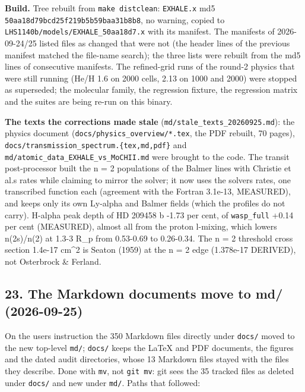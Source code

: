 \documentclass[english,a4paper]{my_memo}
\begin{document}
\textbf{Build.} Tree rebuilt from \texttt{make\ distclean}: \texttt{EXHALE.x} md5
\texttt{50aa18d79bcd25f219b5b59baa31b8b8}, no warning, copied to
\texttt{LHS1140b/models/EXHALE\_50aa18d7.x} with its manifest. The manifests of
2026-09-24/25 listed files as changed that were not (the header lines of the
previous manifest matched the file-name search); the three lists were rebuilt
from the md5 lines of consecutive manifests. The refined-grid runs of the
round-2 physics that were still running (He/H 1.6 on 2000 cells, 2.13 on 1000
and 2000) were stopped as superseded; the molecular family, the regression
fixture, the regression matrix and the suites are being re-run on this binary.

\textbf{The texts the corrections made stale} (\texttt{md/stale\_texts\_20260925.md}):
the physics document (\texttt{docs/physics\_overview/*.tex}, the PDF rebuilt, 70
pages), \texttt{docs/transmission\_spectrum.\{tex,md,pdf\}} and
\texttt{md/atomic\_data\_EXHALE\_vs\_MoCHII.md} were brought to the code. The transit
post-processor built the n = 2 populations of the Balmer lines with Christie
et al.\textquotesingle s rates while claiming to mirror the solver; it now uses the solver\textquotesingle s
rates, one transcribed function each (agreement with the Fortran 3.1e-13,
MEASURED), and keeps only its own Ly-alpha and Balmer fields (which the
profiles do not carry). H-alpha peak depth of HD 209458 b -1.73 per cent,
of \texttt{wasp\_full} +0.14 per cent (MEASURED), almost all from the proton
l-mixing, which lowers n(2s)/n(2) at 1.3-3 R\_p from 0.53-0.69 to 0.26-0.34.
The n = 2 threshold cross section 1.4e-17 cm\^{}2 is Seaton (1959) at the n = 2
edge (1.378e-17 DERIVED), not Osterbrock \& Ferland.

\subsection{23. The Markdown documents move to md/ (2026-09-25)}\label{23-the-markdown-documents-move-to-md-2026-09-25}

On the user\textquotesingle s instruction the 350 Markdown files directly under \texttt{docs/} moved
to the new top-level \texttt{md/}; \texttt{docs/} keeps the LaTeX and PDF documents, the
figures and the dated audit directories, whose 13 Markdown files stayed with
the files they describe. Done with \texttt{mv}, not \texttt{git\ mv}: git sees the 35 tracked
files as deleted under \texttt{docs/} and new under \texttt{md/}. Paths that followed:
\end{document}
